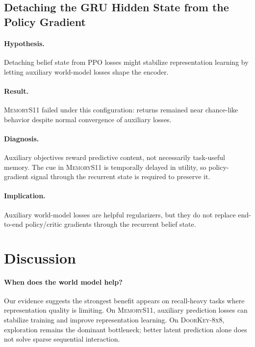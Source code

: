 \subsection{Detaching the GRU Hidden State from the Policy Gradient}

\paragraph{Hypothesis.}
Detaching belief state from PPO losses might stabilize representation learning by letting auxiliary world-model losses shape the encoder.

\paragraph{Result.}
\textsc{MemoryS11} failed under this configuration: returns remained near chance-like behavior despite normal convergence of auxiliary losses.

\paragraph{Diagnosis.}
Auxiliary objectives reward predictive content, not necessarily task-useful memory. The cue in \textsc{MemoryS11} is temporally delayed in utility, so policy-gradient signal through the recurrent state is required to preserve it.

\paragraph{Implication.}
Auxiliary world-model losses are helpful regularizers, but they do not replace end-to-end policy/critic gradients through the recurrent belief state.

\section{Discussion}
\label{sec:discussion}

\paragraph{When does the world model help?}
Our evidence suggests the strongest benefit appears on recall-heavy tasks where representation quality is limiting. On \textsc{MemoryS11}, auxiliary prediction losses can stabilize training and improve representation learning. On \textsc{DoorKey-8x8}, exploration remains the dominant bottleneck; better latent prediction alone does not solve sparse sequential interaction.

